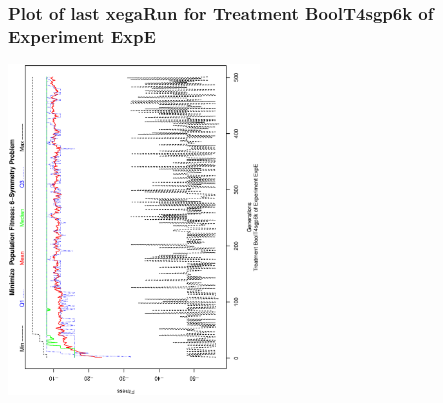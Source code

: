  \begin{frame}
 \frametitle{ Plot of last xegaRun for Treatment BoolT4sgp6k of Experiment ExpE }
 \begin{center}
\includegraphics[width=0.5\textwidth, angle=-90]
{ExpEPlotPopStatsFigure004.eps}
 \end{center}
 \label{report/ExpEPlotPopStatsFigure004.eps}  
 \end{frame}

